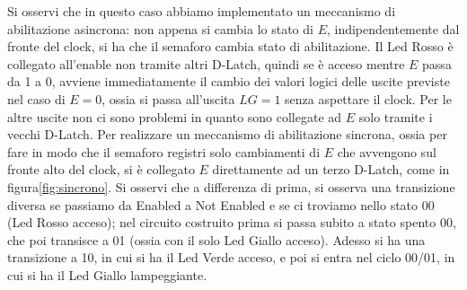 \documentclass[10pt,a4paper]{article}
\begin{document}
Si osservi che in questo caso abbiamo implementato un meccanismo di abilitazione asincrona: non appena si cambia lo stato di $E$, indipendentemente dal fronte del clock, si ha che il semaforo cambia stato di abilitazione. Il Led Rosso è collegato all'enable non tramite altri D-Latch, quindi  se è acceso mentre $E$ passa da 1 a 0, avviene immediatamente il cambio dei valori logici delle uscite previste nel caso di $E = 0$, ossia si passa all'uscita $LG=1$ senza aspettare il clock.
Per le altre uscite non ci sono problemi in quanto sono collegate ad $E$ solo tramite i vecchi D-Latch.
Per realizzare un meccanismo di abilitazione sincrona, ossia per fare in modo che il semaforo registri solo cambiamenti di $E$ che avvengono sul fronte alto del clock, si è collegato $E$ direttamente ad un terzo D-Latch, come in figura\ref{fig:sincrono}.
Si osservi che a differenza di prima, si osserva una transizione diversa se passiamo da Enabled a Not Enabled e se ci troviamo nello stato 00 (Led Rosso acceso); nel circuito costruito prima si passa subito a stato spento 00, che poi transisce a 01 (ossia con il solo Led Giallo acceso). Adesso si ha una transizione a 10, in cui si ha il Led Verde acceso, e poi si entra nel ciclo 00/01, in cui si ha il Led Giallo lampeggiante.
\end{document}
